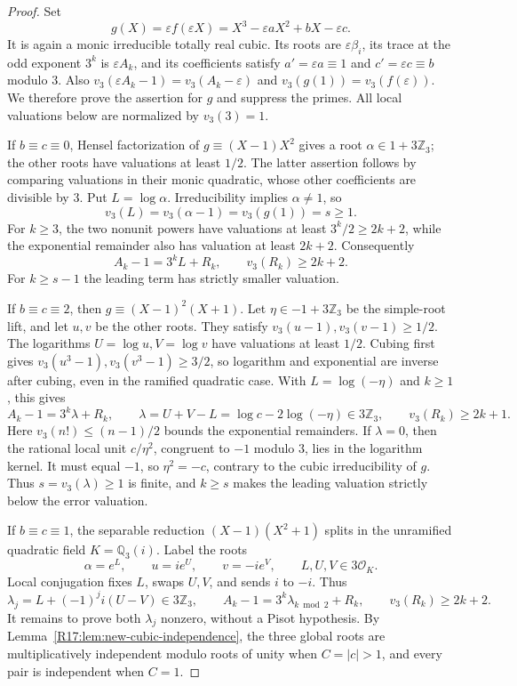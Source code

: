 \documentclass[11pt,a4paper]{article}
\theoremstyle{definition}\newtheorem{definition}[theorem]{Definition}
\theoremstyle{remark}\newtheorem{remark}[theorem]{Remark}
\begin{document}
\begin{proof}
Set
\[
 g(X)=\varepsilon f(\varepsilon X)
   =X^3-\varepsilon aX^2+bX-\varepsilon c.
\]
It is again a monic irreducible totally real cubic. Its roots are
$\varepsilon\beta_i$, its trace at the odd exponent $3^k$ is
$\varepsilon A_k$, and its coefficients satisfy
$a'=\varepsilon a\equiv1$ and $c'=\varepsilon c\equiv b$ modulo $3$.
Also
$v_3(\varepsilon A_k-1)=v_3(A_k-\varepsilon)$ and
$v_3(g(1))=v_3(f(\varepsilon))$.
We therefore prove the assertion for $g$ and suppress the primes.
All local valuations below are normalized by $v_3(3)=1$.

If $b\equiv c\equiv0$, Hensel factorization of
$g\equiv(X-1)X^2$ gives a root $\alpha\in1+3\mathbb Z_3$;
the other roots have valuations at least $1/2$. The latter assertion
follows by comparing valuations in their monic quadratic, whose other
coefficients are divisible by $3$. Put $L=\log\alpha$.
Irreducibility implies $\alpha\ne1$, so
\[
 v_3(L)=v_3(\alpha-1)=v_3(g(1))=s\ge1.
\]
For $k\ge3$, the two nonunit powers have valuations at least
$3^k/2\ge2k+2$, while the exponential remainder also has valuation
at least $2k+2$. Consequently
\[
 A_k-1=3^kL+R_k,\qquad v_3(R_k)\ge2k+2.
\]
For $k\ge s-1$ the leading term has strictly smaller valuation.

If $b\equiv c\equiv2$, then
$g\equiv(X-1)^2(X+1)$. Let
$\eta\in-1+3\mathbb Z_3$ be the simple-root lift, and let $u,v$
be the other roots. They satisfy
$v_3(u-1),v_3(v-1)\ge1/2$.
The logarithms $U=\log u,V=\log v$ have valuations at least $1/2$.
Cubing first gives $v_3(u^3-1),v_3(v^3-1)\ge3/2$, so
logarithm and exponential are inverse after cubing, even in the ramified
quadratic case. With $L=\log(-\eta)$ and $k\ge1$, this gives
\[
 A_k-1=3^k\lambda+R_k,\qquad
 \lambda=U+V-L=\log c-2\log(-\eta)\in3\mathbb Z_3,
 \qquad v_3(R_k)\ge2k+1.
\]
Here $v_3(n!)\le(n-1)/2$ bounds the exponential remainders.
If $\lambda=0$, then the rational local unit $c/\eta^2$, congruent
to $-1$ modulo $3$, lies in the logarithm kernel. It must equal $-1$,
so $\eta^2=-c$, contrary to the cubic irreducibility of $g$.
Thus $s=v_3(\lambda)\ge1$ is finite, and $k\ge s$ makes the
leading valuation strictly below the error valuation.

If $b\equiv c\equiv1$, the separable reduction
$(X-1)(X^2+1)$ splits in the unramified quadratic field
$K=\mathbb Q_3(i)$. Label the roots
\[
 \alpha=e^L,\qquad u=i e^U,\qquad v=-i e^V,
 \qquad L,U,V\in3\mathcal O_K.
\]
Local conjugation fixes $L$, swaps $U,V$, and sends $i$ to $-i$.
Thus
\[
 \lambda_j=L+(-1)^j i(U-V)\in3\mathbb Z_3,
 \qquad A_k-1=3^k\lambda_{k\bmod2}+R_k,
 \qquad v_3(R_k)\ge2k+2.
\]
It remains to prove both $\lambda_j$ nonzero, without a Pisot
hypothesis. By Lemma~\ref{R17:lem:new-cubic-independence}, the three global roots are multiplicatively independent modulo roots of unity when $C=|c|>1$, and every pair is independent when $C=1$.


\end{proof}
\end{document}
